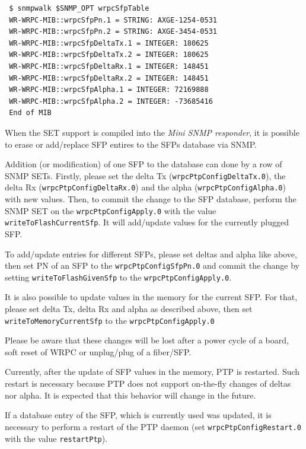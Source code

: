 \documentclass[a4paper, 12pt]{article}
\begin{document}
\begin{lstlisting}
 $ snmpwalk $SNMP_OPT wrpcSfpTable
 WR-WRPC-MIB::wrpcSfpPn.1 = STRING: AXGE-1254-0531
 WR-WRPC-MIB::wrpcSfpPn.2 = STRING: AXGE-3454-0531
 WR-WRPC-MIB::wrpcSfpDeltaTx.1 = INTEGER: 180625
 WR-WRPC-MIB::wrpcSfpDeltaTx.2 = INTEGER: 180625
 WR-WRPC-MIB::wrpcSfpDeltaRx.1 = INTEGER: 148451
 WR-WRPC-MIB::wrpcSfpDeltaRx.2 = INTEGER: 148451
 WR-WRPC-MIB::wrpcSfpAlpha.1 = INTEGER: 72169888
 WR-WRPC-MIB::wrpcSfpAlpha.2 = INTEGER: -73685416
 End of MIB
\end{lstlisting}
When the SET support is compiled into the \textit{Mini SNMP responder}, it is
possible to erase or add/replace SFP entires to the SFPs database via SNMP.

\begin{sloppypar} %
Addition (or modification) of one SFP to the database can done by a row of
SNMP SETs. Firstly, please set the delta Tx (\texttt{wrpcPtpConfigDeltaTx.0}), the
delta Rx (\texttt{wrpcPtpConfigDeltaRx.0}) and the alpha (\texttt{wrpcPtpConfigAlpha.0})
with new values.
Then, to commit the change to the SFP database, perform the SNMP SET on
the \texttt{wrpcPtpConfigApply.0} with the value \texttt{writeToFlashCurrentSfp}. It will
add/update values for the currently plugged SFP.
\end{sloppypar}

To add/update entries for different SFPs, please set deltas and alpha like
above, then set PN of an SFP to the \texttt{wrpcPtpConfigSfpPn.0} and commit
the change by setting \texttt{writeToFlashGivenSfp} to the \texttt{wrpcPtpConfigApply.0}.

It is also possible to update values in the memory for the current SFP.
For that, please set delta Tx, delta Rx and alpha as described above,
then set \texttt{writeToMemoryCurrentSfp} to the \texttt{wrpcPtpConfigApply.0}

Please be aware that these changes will be lost after a power cycle of a board,
soft reset of WRPC or unplug/plug of a fiber/SFP.

Currently, after the update of SFP values in the memory, PTP is restarted.
Such restart is necessary because PTP does not support on-the-fly changes of
deltas nor alpha. It is expected that this behavior will change in the future.

If a database entry of the SFP, which is currently used was updated, it is
necessary to perform a restart of the PTP daemon
(set \texttt{wrpcPtpConfigRestart.0} with the value \texttt{restartPtp}).
\end{document}
